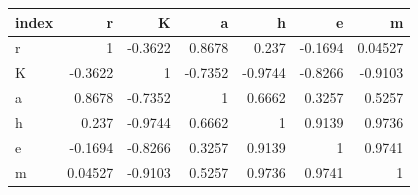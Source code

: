 \begin{tabular}{lrrrrrr}
\toprule
index & r & K & a & h & e & m \\
\midrule
r & 1 & -0.3622 & 0.8678 & 0.237 & -0.1694 & 0.04527 \\
K & -0.3622 & 1 & -0.7352 & -0.9744 & -0.8266 & -0.9103 \\
a & 0.8678 & -0.7352 & 1 & 0.6662 & 0.3257 & 0.5257 \\
h & 0.237 & -0.9744 & 0.6662 & 1 & 0.9139 & 0.9736 \\
e & -0.1694 & -0.8266 & 0.3257 & 0.9139 & 1 & 0.9741 \\
m & 0.04527 & -0.9103 & 0.5257 & 0.9736 & 0.9741 & 1 \\
\bottomrule
\end{tabular}
